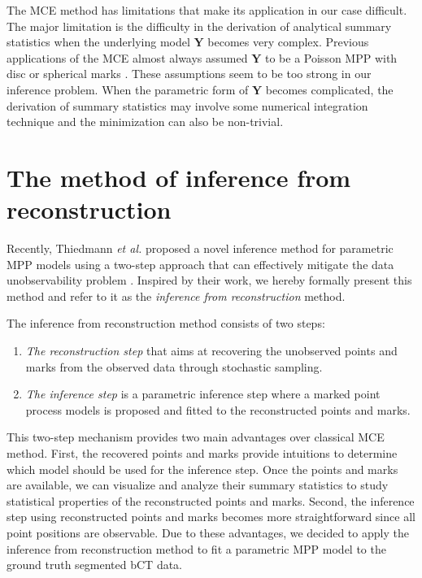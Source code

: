 \documentclass[journal]{IEEEtran}
\begin{document}
The MCE method has limitations that make its application in our case
difficult. The major limitation is the difficulty in the derivation of
analytical summary statistics when the underlying model $\mathbf{Y}$
becomes very complex. Previous applications of the MCE almost always
assumed $\mathbf{Y}$ to be a Poisson MPP with disc or spherical marks
\cite{diggle1981binary} \cite {heinrich1993asymptotic}. These
assumptions seem to be too strong in our inference problem. When the
parametric form of $\mathbf{Y}$ becomes complicated, the derivation of
summary statistics may involve some numerical integration technique
and the minimization can also be non-trivial.

\section{The method of inference from reconstruction }
\label{sec:meth-infer-from-1}

Recently, Thiedmann \textit{et al.} proposed a novel
inference method for parametric MPP models using a two-step approach
that can effectively mitigate the data unobservability problem
\cite{thiedmann2011stochastic}. Inspired by their work, we hereby
formally present this method and refer to it as the \textit{inference
  from reconstruction} method.

The inference from reconstruction method consists of two steps:

\begin{enumerate}[leftmargin=*,noitemsep]
\item \textit{The reconstruction step} that aims at recovering the
  unobserved points and marks from the observed data through
  stochastic sampling.
\item \textit{The inference step} is a parametric inference step where
  a marked point process models is proposed and fitted to the
  reconstructed points and marks.
\end{enumerate}

This two-step mechanism provides two main advantages over classical
MCE method. First, the recovered points and marks provide intuitions
to determine which model should be used for the inference step. Once
the points and marks are available, we can visualize and analyze their
summary statistics to study statistical properties of the
reconstructed points and marks. Second, the inference step using
reconstructed points and marks becomes more straightforward since all
point positions are observable. Due to these advantages, we decided to
apply the inference from reconstruction method to fit a parametric MPP
model to the ground truth segmented bCT data.
\end{document}
